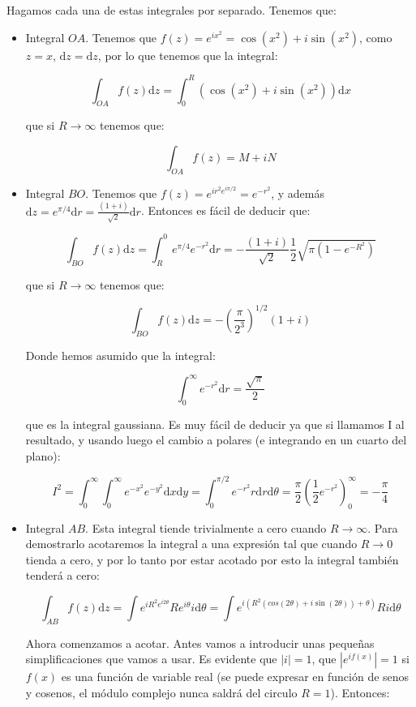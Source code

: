 \documentclass[12pt,a4paper]{book}
\newcommand{\parentesis}[1]{\left( #1  \right)}
\newcommand{\D}{\mathrm{d}}
\newcommand{\into}{\int_{0}^{\infty}}
\begin{document}
Hagamos cada una de estas integrales por separado. Tenemos que:

\begin{itemize}
\item Integral $OA$. Tenemos que $f(z) = e^{ix^2} = \cos (x^2) + i \sin (x^2)$, como $z = x$, $\D z = \D z$, por lo que tenemos que la integral:

$$ \int_{OA} f(z) \D z = \int_{0}^{R} (\cos (x^2) + i \sin (x^2)) \D x   $$

que si $R \rightarrow \infty$ tenemos que:

$$ \int_{OA} f(z) = M + iN  $$

\item Integral $BO$. Tenemos que $f(z) = e^{i r^2 e^{i \pi/2}} = e^{-r^2}$, y además $\D z = e^{\pi/4}  \D r = \frac{(1+i)}{\sqrt{2}} \D r$. Entonces es fácil de deducir que:

$$ \int_{BO} f(z)\D z = \int_R^0 e^{\pi/4} e^{-r^2} \D r = - \dfrac{(1+i)}{\sqrt{2}} \dfrac{1}{2} \sqrt{\pi(1-e^{-R^2})} $$

que si $R \rightarrow \infty$ tenemos que:

$$ \int_{BO} f(z)\D z  =  -  \parentesis{\dfrac{\pi}{2^3}}^{1/2}   \parentesis{1 + i}  $$

Donde hemos asumido que la integral:

$$ \into e^{-r^2} \D r = \dfrac{\sqrt{\pi}}{2}  $$

que es la integral gaussiana. Es muy fácil de deducir ya que si llamamos I al resultado, y usando luego el cambio a polares (e integrando en un cuarto del plano):

$$ I^2 = \into  \into e^{-x^2} e^{-y^2} \D x \D y = \int_{0}^{\pi/2} e^{-r^2} r \D r \D \theta = \dfrac{\pi}{2} \parentesis{\dfrac{1}{2} e^{-r{^2}}}_{0}^\infty = - \dfrac{\pi}{4} $$

\item Integral $AB$. Esta integral tiende trivialmente a cero cuando $R \rightarrow \infty$. Para demostrarlo acotaremos la integral a una expresión tal que cuando $R \rightarrow 0$ tienda a cero, y por lo tanto por estar acotado por esto la integral también tenderá a cero:

$$ \int_{AB} f(z) \D z = \int e^{i R^2 e^{i 2 \theta}} R e^{i \theta} i \D \theta = \int e^{i (R^2 (cos (2 \theta) + i \sin (2 \theta))+\theta)} R i \D \theta  $$

Ahora comenzamos a acotar. Antes vamos a introducir unas pequeñas simplificaciones que vamos a usar. Es evidente que $|i|=1$, que $|e^{i f(x)}| = 1$ si $f(x)$ es una función de variable real (se puede expresar en función de senos y cosenos, el módulo complejo nunca saldrá del circulo $R = 1$). Entonces:


\end{itemize}
\end{document}
